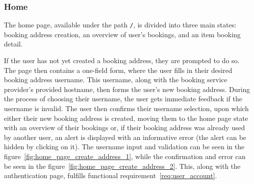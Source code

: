 \subsubsection{Home}

The home page, available under the path \texttt{/}, is divided into three main states: booking address creation, an overview of user's bookings, and an item booking detail.

If the user has not yet created a booking address, they are prompted to do so. The page then contains a one-field form, where the user fills in their desired booking address username. This username, along with the booking service provider's provided hostname, then forms the user's new booking address. During the process of choosing their username, the user gets immediate feedback if the username is invalid. The user then confirms their username selection, upon which either their new booking address is created, moving them to the home page state with an overview of their bookings or, if their booking address was already used by another user, an alert is displayed with an informative error (the alert can be hidden by clicking on it). The username input and validation can be seen in the figure~\ref{fig:home_page_create_address_1}, while the confirmation and error can be seen in the figure~\ref{fig:home_page_create_address_2}. This, along with the authentication page, fulfills functional requirement~\ref{req:user_account}.


